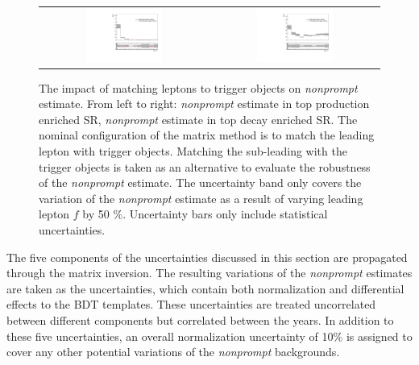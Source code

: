 \begin{figure}[tbh!]
 \begin{center}
 \begin{tabular}{cc}
 \includegraphics[width=0.47\textwidth]{figures/Part3/Systematics/BDT_ST_MM}&
 \includegraphics[width=0.47\textwidth]{figures/Part3/Systematics/BDT_TT_MM} \\
 \end{tabular}
 \caption{The impact of matching leptons to trigger objects on \emph{nonprompt} estimate. From left to right: \emph{nonprompt} estimate in top production enriched \ac{SR}, \emph{nonprompt} estimate in top decay enriched \ac{SR}. The nominal configuration of the matrix method is to match the leading lepton with trigger objects. Matching the sub-leading with the trigger objects is taken as an alternative to evaluate the robustness of the \emph{nonprompt} estimate. The uncertainty band only covers the variation of the \emph{nonprompt} estimate as a result of varying leading lepton $f$ by 50 $\%$. Uncertainty bars only include statistical uncertainties.}
 \label{fig:MM_trigger}
 \end{center}
\end{figure}

The five components of the uncertainties discussed in this section are propagated through the matrix inversion. The resulting variations of the \emph{nonprompt} estimates are taken as the uncertainties, which contain both normalization and differential effects to the BDT templates. These uncertainties are treated uncorrelated between different components but correlated between the years. In addition to these five uncertainties, an overall normalization uncertainty of 10$\%$ is assigned to cover any other potential variations of the \emph{nonprompt} backgrounds.

